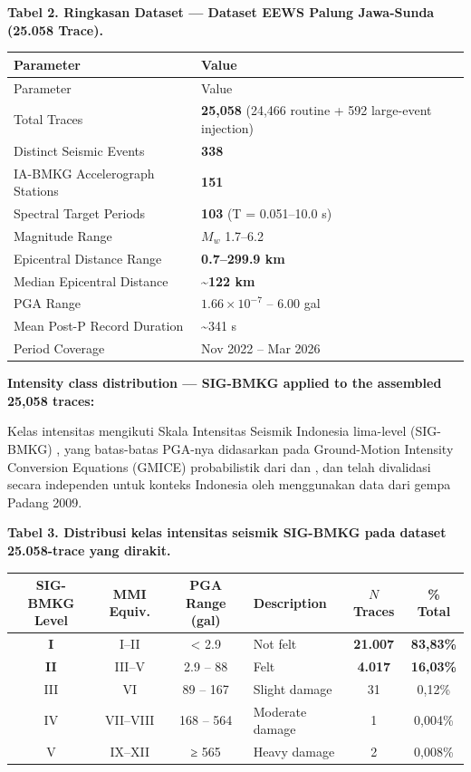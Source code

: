 \documentclass[10pt]{article}
\renewcommand{\cite}[1]{\citep{#1}}
\begin{document}
\par\vspace{16pt}\noindent\begingroup\centering\fontsize{8}{10}\selectfont\textbf{Tabel 2. Ringkasan Dataset --- Dataset EEWS Palung Jawa-Sunda (25.058 Trace).}\par\endgroup\vspace{6pt}
\begin{longtable}[]{@{}>{\raggedright\arraybackslash}p{4cm}>{\raggedright\arraybackslash}p{8cm}@{}}
\toprule
Parameter & Value \\
\midrule
\endfirsthead
\toprule
Parameter & Value \\
\midrule
\endhead
\bottomrule
\endlastfoot
Total Traces & \textbf{25,058} (24,466 routine + 592 large-event injection) \\
Distinct Seismic Events & \textbf{338} \\
IA-BMKG Accelerograph Stations & \textbf{151}  \\
Spectral Target Periods & \textbf{103} (T = 0.051--10.0 s) \\
Magnitude Range & \(M_w\) 1.7--6.2 \\
Epicentral Distance Range & \textbf{0.7--299.9 km} \\
Median Epicentral Distance & \textbf{\textasciitilde122 km} \\
PGA Range & \(1.66 \times 10^{-7}\) -- 6.00 gal \\
Mean Post-P Record Duration & \textasciitilde341 s \\
Period Coverage & Nov 2022 -- Mar 2026 \\
\end{longtable}

\textbf{Intensity class distribution --- SIG-BMKG \cite{BMKG2016} applied to the assembled 25,058 traces:}

Kelas intensitas mengikuti Skala Intensitas Seismik Indonesia lima-level (SIG-BMKG) \cite{BMKG2016}, yang batas-batas PGA-nya didasarkan pada Ground-Motion Intensity Conversion Equations (GMICE) probabilistik dari \citet{Worden2012} dan \citet{Wald1999}, dan telah divalidasi secara independen untuk konteks Indonesia oleh \citet{Caprio2015} menggunakan data dari gempa Padang 2009.

\begin{center}\fontsize{8}{10}\selectfont\textbf{Tabel 3. Distribusi kelas intensitas seismik SIG-BMKG pada dataset 25.058-trace yang dirakit.}\end{center}

\begin{longtable}[]{@{}ccclcc@{}}
\toprule
SIG-BMKG Level & MMI Equiv. & PGA Range (gal) & Description & \(N\) Traces & \% Total\tabularnewline
\midrule
\endhead
\textbf{I} & I--II & \textless{} 2.9 & Not felt & \textbf{21.007} & \textbf{83,83\%}\tabularnewline
\textbf{II} & III--V & 2.9 -- 88 & Felt & \textbf{4.017} & \textbf{16,03\%}\tabularnewline
III & VI & 89 -- 167 & Slight damage & 31 & 0,12\%\tabularnewline
IV & VII--VIII & 168 -- 564 & Moderate damage & 1 & 0,004\%\tabularnewline
V & IX--XII & ≥ 565 & Heavy damage & 2 & 0,008\%\tabularnewline
\bottomrule
\end{longtable}
\end{document}
